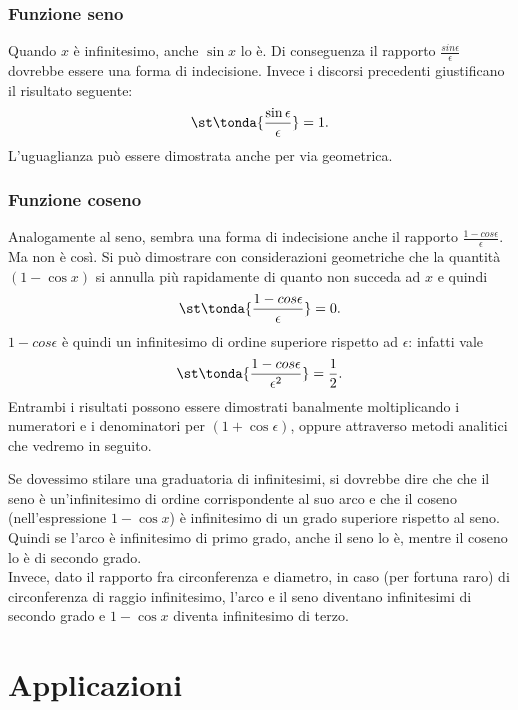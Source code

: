 \subsubsection{Funzione seno}
\label{subsubsec:insnum_fseno}
Quando $x$ è infinitesimo, anche $\sin x$ lo è. Di conseguenza il rapporto
$\frac{sin\epsilon}{\epsilon}$ dovrebbe essere una forma di indecisione. 
Invece i discorsi precedenti giustificano il risultato seguente:
\[
 \st\tonda{\frac{\sin \epsilon}{\epsilon}}=1.
\]
L'uguaglianza può essere dimostrata anche per via geometrica.

\subsubsection{Funzione coseno}
\label{subsubsec:insnum_fcoseno}
Analogamente al seno, sembra una forma di indecisione anche il rapporto
\(\frac{1-cos \epsilon}{\epsilon}\).
Ma non è così. Si può dimostrare con considerazioni geometriche che 
la quantità $(1-\cos x)$ si annulla più rapidamente di quanto non succeda ad 
$x$ e quindi
\[
 \st\tonda{\frac{1-cos \epsilon}{\epsilon}}=0.
\]
$1-cos \epsilon$ è quindi un infinitesimo di ordine superiore rispetto ad 
$\epsilon$: infatti vale
\[
 \st\tonda{\frac{1-cos \epsilon}{\epsilon^2}}=\frac{1}{2}.
\]
Entrambi i risultati possono essere dimostrati banalmente moltiplicando i 
numeratori e i denominatori per $(1+\cos \epsilon)$, oppure attraverso 
metodi analitici che vedremo in seguito.

\begin{osservazione}
Se dovessimo stilare una graduatoria di infinitesimi, si dovrebbe dire che 
che il seno è un'infinitesimo di ordine corrispondente al suo arco e che il coseno
(nell'espressione $1-\cos x$) è infinitesimo di un grado superiore rispetto al seno.
Quindi se l'arco è infinitesimo di primo grado, anche il seno lo è, mentre
il coseno lo è di secondo grado.\\
Invece, dato il rapporto fra circonferenza e diametro, in caso (per fortuna raro)
di circonferenza di raggio infinitesimo, l'arco e il seno diventano infinitesimi
di secondo grado e $1-\cos x$ diventa infinitesimo di terzo.
\end{osservazione}



\section{Applicazioni}
\label{sec:insnum_applicazioni}

